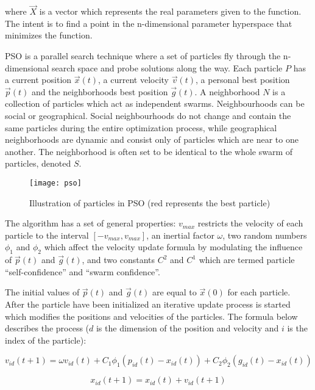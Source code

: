 where $\vec{X}$ is a vector which represents the real parameters given to the function. The intent is to find a point in the n-dimensional parameter hyperspace that minimizes the function.

PSO is a parallel search technique where a set of particles  fly through the n-dimensional search space and probe solutions along the way. Each particle $P$ has a current position $\vec{x}(t)$, a current velocity $\vec{v}(t)$, a personal best position $\vec{p}(t)$ and the neighborhoods best position $\vec{g}(t)$. A neighborhood $N$ is a collection of particles which act as independent swarms. Neighbourhoods can be social or geographical. Social neighbourhoods do not change and contain the same particles during the entire optimization process, while geographical neighborhoods are dynamic and consist only of particles which are near to one another. The neighborhood is often set to be identical to the whole swarm of particles, denoted $S$.

\begin{figure}[H]
  \centering
  \texttt{[image: pso]}
  \caption{Illustration of particles in PSO (red represents the best particle)}
  \label{fig:pso}
\end{figure}

The algorithm has a set of general properties: $v_{max}$ restricts the velocity of each particle to the interval $[-v_{max},v_{max}]$, an inertial factor $\omega$, two random numbers $\phi_1$ and $\phi_2$ which affect the velocity update formula by modulating the influence of $\vec{p}(t)$ and $\vec{g}(t)$, and two constants $C^2$ and $C^1$ which are termed particle “self-confidence” and “swarm confidence”.

The initial values of $\vec{p}(t)$ and $\vec{g}(t)$ are equal to $\vec{x}(0)$ for each particle. After the particle have been initialized an iterative update process is started which modifies the positions and velocities of the particles. The formula below describes the process ($d$ is the dimension of the position and velocity and $i$ is the index of the particle):

\begin{equation}
  v_{id} (t+1) = \omega v_{id} (t) + C_1 \phi_1 (p_{id} (t) - x_{id} (t)) + C_2 \phi_2 (g_{id} (t) - x_{id} (t))
\end{equation}

\begin{equation}
  x_{id} (t+1) = x_{id} (t) + v_{id} (t+1)
\end{equation}


